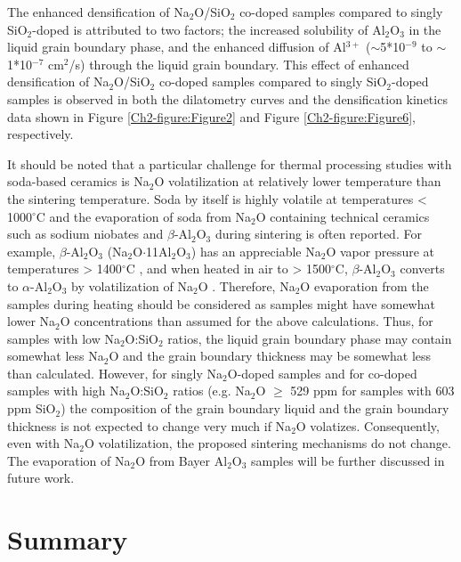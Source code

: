 The enhanced densification of Na$_{2}$O/SiO$_{2}$ co-doped samples compared to singly SiO$_{2}$-doped is attributed to two factors; the increased solubility of Al$_{2}$O$_{3}$ in the liquid grain boundary phase, and the enhanced diffusion of Al$^{3+}$ ($\sim$5*10$^{-9}$ to $\sim$1*10$^{-7}$ cm$^{2}$/s) through the liquid grain boundary. This effect of enhanced densification of Na$_{2}$O/SiO$_{2}$ co-doped samples compared to singly SiO$_{2}$-doped samples is observed in both the dilatometry curves and the densification kinetics data shown in Figure \ref{Ch2-figure:Figure2} and Figure \ref{Ch2-figure:Figure6}, respectively. 

It should be noted that a particular challenge for thermal processing studies with soda-based ceramics is Na$_{2}$O volatilization at relatively lower temperature than the sintering temperature. Soda by itself is highly volatile at temperatures < 1000$^{\circ}$C and the evaporation of soda from Na$_{2}$O containing technical ceramics such as sodium niobates \cite{Popovic2012} and $\beta$-Al$_{2}$O$_{3}$ during sintering is often reported. For example, $\beta$-Al$_{2}$O$_{3}$ (Na$_{2}$O$\cdot$11Al$_{2}$O$_{3}$) has an appreciable Na$_{2}$O vapor pressure at temperatures > 1400$^{\circ}$C \cite{Kummer1972}, and when heated in air to > 1500$^{\circ}$C, $\beta$-Al$_{2}$O$_{3}$ converts to $\alpha$-Al$_{2}$O$_{3}$ by volatilization of Na$_{2}$O \cite{Kummer1972,Gallup1935}. Therefore, Na$_{2}$O evaporation from the samples during heating should be considered as samples might have somewhat lower Na$_{2}$O concentrations than assumed for the above calculations. Thus, for samples with low Na$_{2}$O:SiO$_{2}$ ratios, the liquid grain boundary phase may contain somewhat less Na$_{2}$O and the grain boundary thickness may be somewhat less than calculated. However, for singly Na$_{2}$O-doped samples and for co-doped samples with high Na$_{2}$O:SiO$_{2}$ ratios (e.g. Na$_{2}$O $\geq$ 529 ppm for samples with 603 ppm SiO$_{2}$) the composition of the grain boundary liquid and the grain boundary thickness is not expected to change very much if Na$_{2}$O volatizes. Consequently, even with Na$_{2}$O volatilization, the proposed sintering mechanisms do not change. The evaporation of Na$_{2}$O from Bayer Al$_{2}$O$_{3}$ samples will be further discussed in future work.

\section{Summary}

